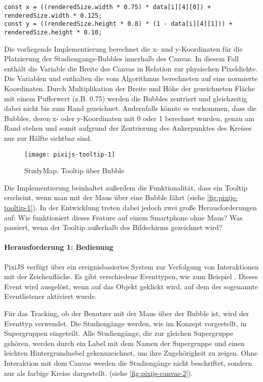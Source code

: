 \begin{lstlisting}[style=Python]
const x = ((renderedSize.width * 0.75) * data[i][4][0]) + renderedSize.width * 0.125;
const y = ((renderedSize.height * 0.8) * (1 - data[i][4][1])) + renderedSize.height * 0.10;
\end{lstlisting}

Die vorliegende Implementierung berechnet die x- und y-Koordinaten für die Platzierung der Studiengangs-Bubbles innerhalb des Canvas. In diesem Fall enthält die Variable  die Breite des Canvas in Relation zur physischen Pixeldichte. Die Variablen  und  enthalten die vom Algorithmus berechneten auf eins normierte Koordinaten. Durch Multiplikation der Breite und Höhe der gezeichneten Fläche mit einem Pufferwert (z.B. 0.75) werden die Bubbles zentriert und gleichzeitig dabei nicht bis zum Rand gezeichnet. Andernfalls könnte es vorkommen, dass die Bubbles, deren x- oder y-Koordinaten mit 0 oder 1 berechnet wurden, genau am Rand stehen und somit aufgrund der Zentrierung des Ankerpunktes des Kreises nur zur Hälfte sichtbar sind.

\begin{figure}[H]
    \centering
    \texttt{[image: pixijs-tooltip-1]}
    \caption{StudyMap: Tooltip über Bubble}
    \label{fig:pixijs-tooltip-1}
\end{figure}

Die Implementierung beinhaltet außerdem die Funktionalität, dass ein Tooltip erscheint, wenn man mit der Maus über eine Bubble fährt (siehe \autoref{fig:pixijs-tooltip-1}). In der Entwicklung treten dabei jedoch zwei große Herausforderungen auf: Wie funktioniert dieses Feature auf einem Smartphone ohne Maus? Was passiert, wenn der Tooltip außerhalb des Bildschirms gezeichnet wird?

\paragraph*{Herausforderung 1: Bedienung}
PixiJS verfügt über ein ereignisbasiertes System zur Verfolgung von Interaktionen mit der Zeichenfläche. Es gibt verschiedene Eventtypen, wie zum Beispiel . Dieses Event wird ausgelöst, wenn auf das Objekt geklickt wird, auf dem der sogenannte Eventlistener aktiviert wurde. \parencite{pixijs_interaction_2024}

Für das Tracking, ob der Benutzer mit der Maus über der Bubble ist, wird der Eventtyp  verwendet. Die Studiengänge werden, wie im Konzept vorgestellt, in Supergruppen eingeteilt. Alle Studiengänge, die zur gleichen Supergruppe gehören, werden durch ein Label mit dem Namen der Supergruppe und einen leichten Hintergrundnebel gekennzeichnet, um ihre Zugehörigkeit zu zeigen. Ohne Interaktion mit dem Canvas werden die Studiengänge nicht beschriftet, sondern nur als farbige Kreise dargestellt. (siehe \autoref{fig:pixijs-canvas-2}).

